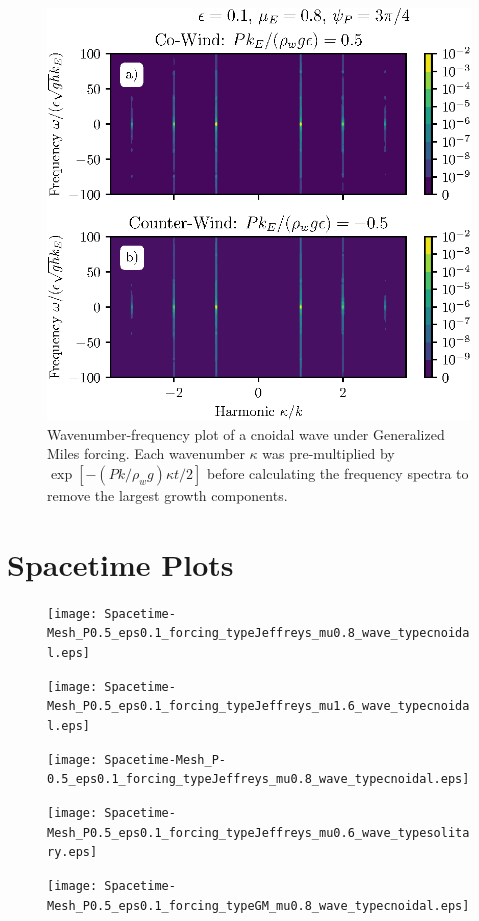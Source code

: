 \documentclass{jfm}
\let\Oldsection\section
\renewcommand{\section}{\FloatBarrier\Oldsection}
\begin{document}
\begin{figure}
  \centering
  \includegraphics{Double-Power-Spectrum-GM.eps}
  \caption{
    Wavenumber-frequency plot of a cnoidal wave under Generalized Miles
    forcing.
    Each wavenumber $\kappa$ was pre-multiplied by $\exp[-(P k/\rho_w
    g) \kappa t/2]$ before calculating the frequency spectra to remove
    the largest growth components.
  }
\end{figure}

\section{Spacetime Plots}
\begin{figure}
  \centering
  \texttt{[image: Spacetime-Mesh\_P0.5\_eps0.1\_forcing\_typeJeffreys\_mu0.8\_wave\_typecnoidal.eps]}
  \caption{}
\end{figure}

\begin{figure}
  \centering
  \texttt{[image: Spacetime-Mesh\_P0.5\_eps0.1\_forcing\_typeJeffreys\_mu1.6\_wave\_typecnoidal.eps]}
  \caption{}
\end{figure}

\begin{figure}
  \centering
  \texttt{[image: Spacetime-Mesh\_P-0.5\_eps0.1\_forcing\_typeJeffreys\_mu0.8\_wave\_typecnoidal.eps]}
  \caption{}
\end{figure}

\begin{figure}
  \centering
  \texttt{[image: Spacetime-Mesh\_P0.5\_eps0.1\_forcing\_typeJeffreys\_mu0.6\_wave\_typesolitary.eps]}
  \caption{}
\end{figure}

\begin{figure}
  \centering
  \texttt{[image: Spacetime-Mesh\_P0.5\_eps0.1\_forcing\_typeGM\_mu0.8\_wave\_typecnoidal.eps]}
  \caption{}
\end{figure}
\end{document}

